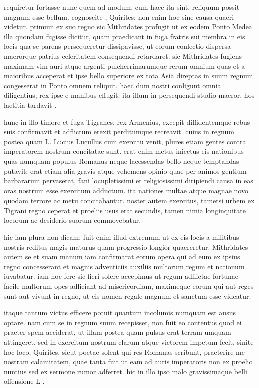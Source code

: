 requiretur fortasse nunc quem ad modum, cum haec ita sint, reliquum possit magnum esse bellum. cognoscite , Quirites; non enim hoc sine causa quaeri videtur. primum ex suo regno sic Mithridates profugit ut ex eodem Ponto Medea illa quondam fugisse dicitur, quam praedicant in fuga fratris sui membra in eis locis qua se parens persequeretur dissipavisse, ut eorum conlectio dispersa maerorque patrius celeritatem consequendi retardaret. sic Mithridates fugiens maximam vim auri atque argenti pulcherrimarumque rerum omnium quas et a maioribus acceperat et ipse bello superiore ex tota Asia direptas in suum regnum congesserat in Ponto omnem reliquit. haec dum nostri conligunt omnia diligentius, rex ipse e manibus effugit. ita illum in persequendi studio maeror, hos laetitia tardavit .

 hunc in illo timore et fuga Tigranes, rex Armenius, excepit diffidentemque rebus suis confirmavit et adflictum erexit perditumque recreavit. cuius in regnum postea quam L. Lucius Lucullus cum exercitu venit, plures etiam gentes contra imperatorem nostrum concitatae sunt. erat enim metus iniectus eis nationibus quas numquam populus Romanus neque lacessendas bello neque temptandas putavit; erat etiam alia gravis atque vehemens opinio quae per animos gentium barbararum pervaserat, fani locupletissimi et religiosissimi diripiendi causa in eas oras nostrum esse exercitum adductum. ita nationes multae atque magnae novo quodam terrore ac metu concitabantur. noster autem exercitus, tametsi urbem ex Tigrani regno ceperat et proeliis usus erat secundis, tamen nimia longinquitate locorum ac desiderio suorum commovebatur.

 hic iam plura non dicam; fuit enim illud extremum ut ex eis locis a militibus nostris reditus magis maturus quam progressio longior quaereretur. Mithridates autem se et suam manum iam confirmarat eorum opera qui ad eum ex ipsius regno concesserant et magnis adventiciis auxiliis multorum regum et nationum iuvabatur. iam hoc fere sic fieri solere accepimus ut regum adflictae fortunae facile multorum opes adliciant ad misericordiam, maximeque eorum qui aut reges sunt aut vivunt in regno, ut eis nomen regale magnum et sanctum esse videatur.

 itaque tantum victus efficere potuit quantum incolumis numquam est ausus optare. nam cum se in regnum suum recepisset, non fuit eo contentus quod ei praeter spem acciderat, ut illam postea quam pulsus erat terram umquam attingeret, sed in exercitum nostrum clarum atque victorem impetum fecit. sinite hoc loco, Quirites, sicut poetae solent qui res Romanas scribunt, praeterire me nostram calamitatem, quae tanta fuit ut eam ad auris imperatoris non ex proelio nuntius sed ex sermone rumor adferret. hic in illo ipso malo gravissimaque belli offensione L .

